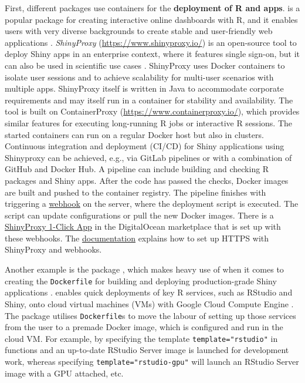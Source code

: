 First, different packages use containers for the \textbf{deployment of R
and  apps}.  is a popular package for creating
interactive online dashboards with R, and it enables users with very
diverse backgrounds to create stable and user-friendly web applications
\citep{cran_shiny}. \emph{ShinyProxy} (\url{https://www.shinyproxy.io/})
is an open-source tool to deploy Shiny apps in an enterprise context,
where it features single sign-on, but it can also be used in scientific
use cases
\citep[e.g., ][]{savini_epiexplorer_2019,glouzon_structurexplor_2017}.
ShinyProxy uses Docker containers to isolate user sessions and to
achieve scalability for multi-user scenarios with multiple apps.
ShinyProxy itself is written in Java to accommodate corporate
requirements and may itself run in a container for stability and
availability. The tool is built on ContainerProxy
(\url{https://www.containerproxy.io/}), which provides similar features
for executing long-running R jobs or interactive R sessions. The started
containers can run on a regular Docker host but also in clusters.
Continuous integration and deployment (CI/CD) for Shiny applications
using Shinyproxy can be achieved, e.g., via GitLab pipelines or with a
combination of GitHub and Docker Hub. A pipeline can include building
and checking R packages and Shiny apps. After the code has passed the
checks, Docker images are built and pushed to the container registry.
The pipeline finishes with triggering a
\href{https://github.com/analythium/shinyproxy-1-click/blob/master/digitalocean/setup.md\#setting-up-webhook}{webhook}
on the server, where the deployment script is executed. The script can
update configurations or pull the new Docker images. There is a
\href{https://marketplace.digitalocean.com/apps/shinyproxy}{ShinyProxy
1-Click App} in the DigitalOcean marketplace that is set up with these
webhooks. The
\href{https://github.com/analythium/shinyproxy-1-click/blob/master/digitalocean/secure.md}{documentation}
explains how to set up HTTPS with ShinyProxy and webhooks.

Another example is the package , which makes heavy use of
 when it comes to creating the \texttt{Dockerfile} for
building and deploying production-grade Shiny applications
\citep{cran_golem}.  enables quick
deployments of key R services, such as RStudio and Shiny, onto cloud
virtual machines (VMs) with Google Cloud Compute Engine
\citep{googleComputeEngineR_2019}. The package utilises
\texttt{Dockerfile}s to move the labour of setting up those services
from the user to a premade Docker image, which is configured and run in
the cloud VM. For example, by specifying the template
\texttt{template="rstudio"} in functions  and
 an up-to-date RStudio Server image is launched for
development work, whereas specifying \texttt{template="rstudio-gpu"}
will launch an RStudio Server image with a GPU attached, etc.

